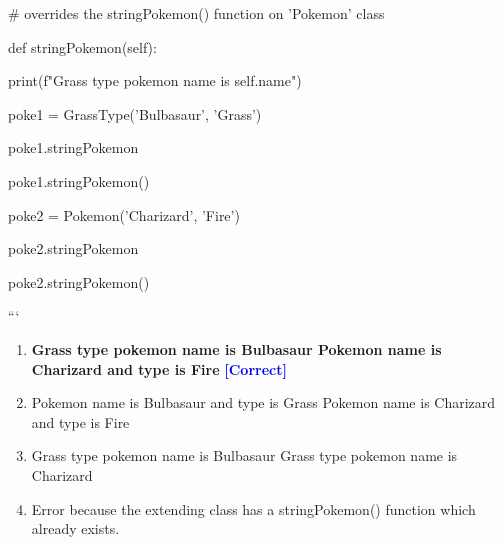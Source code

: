 \documentclass[11pt,a4paper]{article}
\begin{document}
\begin{minipage}{\textwidth}
{\newline
    # overrides the stringPokemon() function on 'Pokemon' class\newline

\newline
    def stringPokemon(self):\newline

\newline
        print(f"Grass type pokemon name is self.name")\newline

\newline
\newline

\newline
poke1 = GrassType('Bulbasaur', 'Grass')\newline

\newline
poke1.stringPokemon\newline

\newline
poke1.stringPokemon()\newline

\newline
poke2 = Pokemon('Charizard', 'Fire')\newline

\newline
poke2.stringPokemon\newline

\newline
poke2.stringPokemon()\newline

\newline
```}

\begin{enumerate}[label=\Alph*.]
    \item \textbf{Grass type pokemon name is Bulbasaur Pokemon name is Charizard and type is Fire} \hfill \textcolor{blue}{\textbf{[Correct]}}
    \item Pokemon name is Bulbasaur and type is Grass Pokemon name is Charizard and type is Fire
    \item Grass type pokemon name is Bulbasaur Grass type pokemon name is Charizard
    \item Error because the extending class has a stringPokemon() function which already exists.
\end{enumerate}


\end{minipage}
\end{document}
